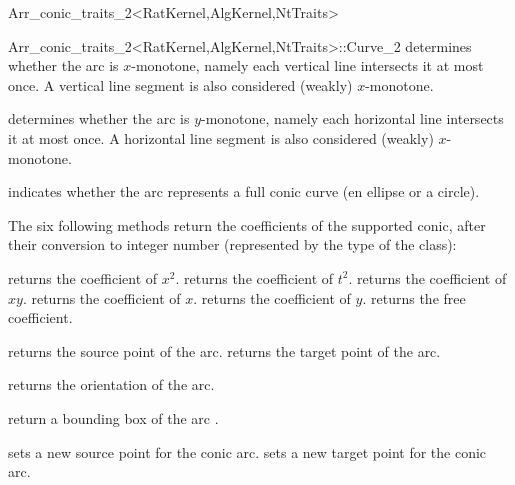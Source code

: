 \begin{ccRefClass}{Arr_conic_traits_2<RatKernel,AlgKernel,NtTraits>}
\begin{ccClass}{Arr_conic_traits_2<RatKernel,AlgKernel,NtTraits>::Curve_2}
  {determines whether the arc is $x$-monotone, namely each vertical line
   intersects it at most once. A vertical line segment is also considered
   (weakly) $x$-monotone.}

  {determines whether the arc is $y$-monotone, namely each horizontal line
   intersects it at most once. A horizontal line segment is also considered
   (weakly) $x$-monotone.}

  {indicates whether the arc represents a full conic curve (en ellipse or
   a circle).}

The six following methods return the coefficients of the supported conic,
after their conversion to integer number (represented by the 
type of the  class):


  {returns the coefficient of $x^2$.}
\ccGlue
{}
  {returns the coefficient of $t^2$.}
\ccGlue
{}
  {returns the coefficient of $x y$.}
\ccGlue
{}
  {returns the coefficient of $x$.}
\ccGlue
{}
  {returns the coefficient of $y$.}
\ccGlue
{}
  {returns the free coefficient.}


  {returns the source point of the arc.
   }
\ccGlue
{}
  {returns the target point of the arc.
   }

  {returns the orientation of the arc.}

  {return a bounding box of the arc \ccVar{}.}


\ccOperations

  {sets a new source point for the conic arc.
   }
\ccGlue
{}
  {sets a new target point for the conic arc.
   }


\end{ccClass}
\end{ccRefClass}

